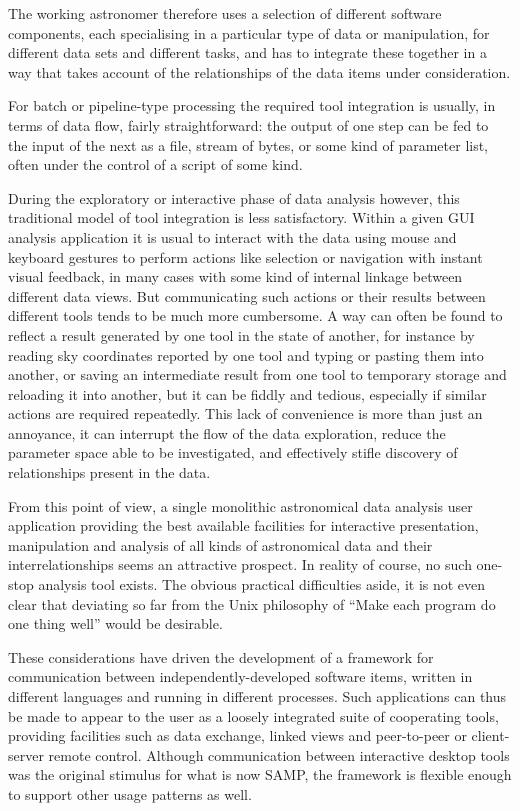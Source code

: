 \documentclass[5p]{elsarticle}
\begin{document}
The working astronomer therefore uses a selection
of different software components,
each specialising in a particular type of data or manipulation,
for different data sets and different tasks,
and has to integrate these together in a way that takes account of
the relationships of the data items under consideration.

For batch or pipeline-type processing the required tool integration
is usually, in terms of data flow, fairly straightforward:
the output of one step can be fed to the input of the next as a file,
stream of bytes, or some kind of parameter list,
often under the control of a script of some kind.

During the exploratory or interactive phase of data analysis however,
this traditional model of tool integration is less satisfactory.
Within a given GUI analysis application
it is usual to interact with the data using
mouse and keyboard gestures to perform actions like selection or
navigation with instant visual feedback, in many cases with some
kind of internal linkage between different data views.
But communicating such actions or their results between different
tools tends to be much more cumbersome.
A way can often be found to reflect a result generated by one tool
in the state of another, for instance by reading sky coordinates
reported by one tool and typing or pasting them into another,
or saving an intermediate result from one tool to temporary storage
and reloading it into another, but it can be fiddly and tedious,
especially if similar actions are required repeatedly.
This lack of convenience is more than just an annoyance, it can
interrupt the flow of the data exploration, reduce the parameter
space able to be investigated, and effectively stifle discovery
of relationships present in the data.

From this point of view, a single monolithic astronomical data analysis
user application providing the best available facilities for
interactive presentation, manipulation and analysis of all kinds of
astronomical data and their interrelationships seems an attractive prospect.
In reality of course, no such one-stop analysis tool exists.
The obvious practical difficulties aside, it is not even clear
that deviating so far from the Unix philosophy of
``Make each program do one thing well'' \citep{mcilroy1978}
would be desirable.

These considerations have driven the development of a framework
for communication between independently-developed software items,
written in different languages and running in different processes.
Such applications can thus be made to appear to the user
as a loosely integrated suite of cooperating tools,
providing facilities such as data exchange, linked views and
peer-to-peer or client-server remote control.
Although communication between interactive desktop tools was the
original stimulus for what is now SAMP, the framework is flexible
enough to support other usage patterns as well.
\end{document}
